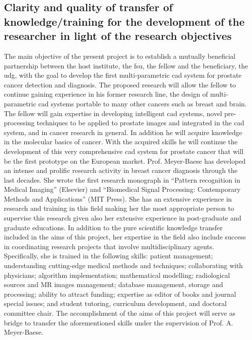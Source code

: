 \subsection{Clarity and quality of transfer of knowledge/training for the development of the researcher in light of the research objectives}
\label{sec:transfer}

The main objective of the present project is to establish a mutually beneficial partnership between the host institute, the \ac{fsu}, the fellow and the beneficiary, the \ac{udg}, with the goal to develop the first multi-parametric \ac{cad} system for prostate cancer detection and diagnosis.
The proposed research will allow the fellow to continue gaining experience in his former research line, the design of multi-parametric \ac{cad} systems portable to many other cancers such as breast and brain. The fellow will gain expertise in developing intelligent \ac{cad} systems, novel pre-processing techniques to be applied to prostate images and integrated in the \ac{cad} system, and in cancer research in general. In addition he will acquire knowledge in the molecular basics of cancer. With the acquired skills he will continue the development of this very comprehensive \ac{cad} system for prostate cancer that will be the first prototype on the European market.
Prof. Meyer-Baese has developed an intense and prolific research activity in breast cancer diagnosis through the last decades. She wrote the first research monograph in ``Pattern recognition in Medical Imaging'' (Elsevier) and ``Biomedical Signal Processing: Contemporary Methods and Applications'' (MIT Press). She has an extensive experience in research and training in this field making her the most appropriate person to supervise this research given also her extensive experience in post-graduate and graduate educations. In addition to the pure scientific knowledge transfer included in the aims of this project, her expertise in the field also include success in coordinating research projects that involve multidisciplinary agents. Specifically, she is trained in the following skills: patient management; understanding cutting-edge medical methods and techniques; collaborating with physicians; algorithm implementation; mathematical modelling; radiological sources and MR images management; database management, storage and processing; ability to attract funding; expertise as editor of books and journal special issues; and student tutoring, curriculum development, and doctoral committee chair. The accomplishment of the aims of this project will serve as bridge to transfer the aforementioned skills under the supervision of Prof. A. Meyer-Baese.
